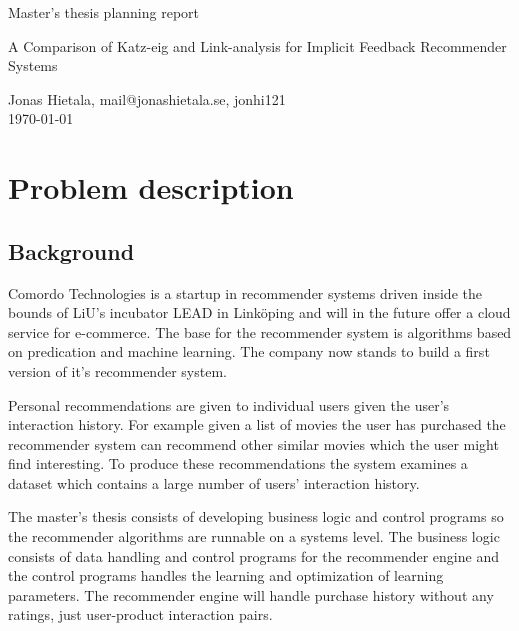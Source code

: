 \documentclass[11pt]{article}
\begin{document}
\begin{center}

{ \Large Master's thesis planning report\\[0.5cm] }


{ \LARGE A Comparison of Katz-eig and Link-analysis for Implicit Feedback Recommender Systems \\[0.4cm] }

Jonas Hietala, mail@jonashietala.se, jonhi121 \\[0.2cm]

\today

\end{center}


\section*{Problem description}

\subsection*{Background}

Comordo Technologies is a startup in recommender systems driven inside the bounds of LiU's incubator LEAD in Linköping and will in the future offer a cloud service for e-commerce. The base for the recommender system is algorithms based on predication and machine learning. The company now stands to build a first version of it's recommender system.

Personal recommendations are given to individual users given the user's interaction history. For example given a list of movies the user has purchased the recommender system can recommend other similar movies which the user might find interesting. To produce these recommendations the system examines a dataset which contains a large number of users' interaction history.

The master's thesis consists of developing business logic and control programs so the recommender algorithms are runnable on a systems level. The business logic consists of data handling and control programs for the recommender engine and the control programs handles the learning and optimization of learning parameters. The recommender engine will handle purchase history without any ratings, just user-product interaction pairs.
\end{document}
